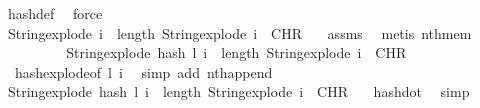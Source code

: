 \begin{isabellebody}
\ hash{\isacharunderscore}{\kern0pt}def\ \isamarkupfalse%
\ force\isanewline
\ \ \ \ \isamarkupfalse%
\isanewline
\ \ \ \ \ \ \isamarkupfalse%
\ {}\isanewline
\ \ \ \ \ \ \isamarkupfalse%
\ \isamarkupfalse%
\ {\isachardoublequoteopen}String{\isachardot}{\kern0pt}explode\ i{\isacharprime}{\kern0pt}\ {\isacharbang}{\kern0pt}\ length\ {\isacharparenleft}{\kern0pt}String{\isachardot}{\kern0pt}explode\ i{\isacharparenright}{\kern0pt}\ {\isasymnoteq}\ CHR\ {\isacharprime}{\kern0pt}{\isacharprime}{\kern0pt}{\isachardot}{\kern0pt}{\isacharprime}{\kern0pt}{\isacharprime}{\kern0pt}{\isachardoublequoteclose}\ \isamarkupfalse%
\ assms{\isacharparenleft}{\kern0pt}{}{\isacharparenright}{\kern0pt}\ \isamarkupfalse%
\ {\isacharparenleft}{\kern0pt}metis\ nth{\isacharunderscore}{\kern0pt}mem{\isacharparenright}{\kern0pt}\isanewline
\ \ \ \ \ \ \isamarkupfalse%
\ \isamarkupfalse%
\ {\isachardoublequoteopen}String{\isachardot}{\kern0pt}explode\ {\isacharparenleft}{\kern0pt}hash\ l{\isacharprime}{\kern0pt}\ i{\isacharprime}{\kern0pt}{\isacharparenright}{\kern0pt}\ {\isacharbang}{\kern0pt}\ length\ {\isacharparenleft}{\kern0pt}String{\isachardot}{\kern0pt}explode\ i{\isacharparenright}{\kern0pt}\ {\isasymnoteq}\ CHR\ {\isacharprime}{\kern0pt}{\isacharprime}{\kern0pt}{\isachardot}{\kern0pt}{\isacharprime}{\kern0pt}{\isacharprime}{\kern0pt}{\isachardoublequoteclose}\ \isamarkupfalse%
\ {}\ hash{\isacharunderscore}{\kern0pt}explode{\isacharbrackleft}{\kern0pt}of\ l{\isacharprime}{\kern0pt}\ i{\isacharprime}{\kern0pt}{\isacharbrackright}{\kern0pt}\ \isamarkupfalse%
\ {\isacharparenleft}{\kern0pt}simp\ add{\isacharcolon}{\kern0pt}\ nth{\isacharunderscore}{\kern0pt}append{\isacharparenright}{\kern0pt}\isanewline
\ \ \ \ \ \ \isamarkupfalse%
\ \isamarkupfalse%
\ {\isachardoublequoteopen}String{\isachardot}{\kern0pt}explode\ {\isacharparenleft}{\kern0pt}hash\ l\ i{\isacharparenright}{\kern0pt}\ {\isacharbang}{\kern0pt}\ length\ {\isacharparenleft}{\kern0pt}String{\isachardot}{\kern0pt}explode\ i{\isacharparenright}{\kern0pt}\ {\isacharequal}{\kern0pt}\ CHR\ {\isacharprime}{\kern0pt}{\isacharprime}{\kern0pt}{\isachardot}{\kern0pt}{\isacharprime}{\kern0pt}{\isacharprime}{\kern0pt}{\isachardoublequoteclose}\ \isamarkupfalse%
\ hash{\isacharunderscore}{\kern0pt}dot\ \isamarkupfalse%
\ simp\isanewline
\ \ \ \ \ \ \isamarkupfalse%

\end{isabellebody}
